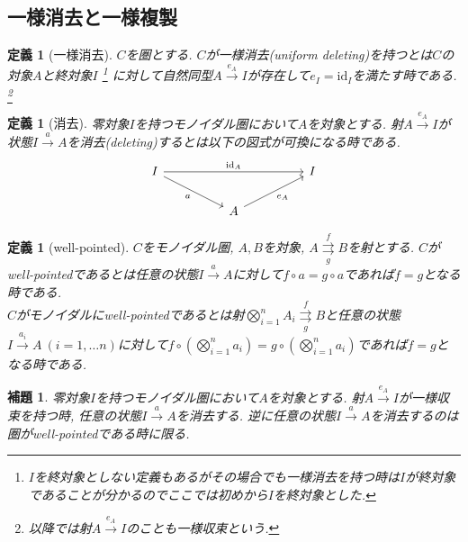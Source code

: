 \documentclass[a4paper,12pt]{ltjsarticle}
\theoremstyle{break}
\newtheorem{defn}[thm]{定義}
\newtheorem{lem}[thm]{補題}
\newtheorem{thrm}[thm]{定理}
\newcommand{\xr}[1]{\xrightarrow{#1}}
\newcommand{\id}{\mathrm{id}}
\newcommand{\ci}{\circ}
\newcommand{\bigot}{\bigotimes}
\numberwithin{equation}{section}
\begin{document}
\subsection{一様消去と一様複製}

\begin{defn}[一様消去]
  $C$を圏とする.
  $C$が一様消去(uniform deleting)を持つとは$C$の対象$A$と終対象$I$
  \footnote{
    $I$を終対象としない定義もあるがその場合でも一様消去を持つ時は$I$が終対象であることが分かるのでここでは初めから$I$を終対象とした. 
  }
  に対して自然同型$A \xr{e_A} I$が存在して$e_I=\id_I$を満たす時である.
  \footnote{
    以降では射$A \xr{e_A} I$のことも一様収束という.
  }
\end{defn}


\begin{defn}[消去]
  零対象$I$を持つモノイダル圏において$A$を対象とする. 
  射$A \xr{e_A} I$が状態$I \xr{a} A$を消去(deleting)するとは以下の図式が可換になる時である. 
  \[\begin{tikzcd}
    I &&&& I \\
    && A
    \arrow["{\id_A}", from=1-1, to=1-5]
    \arrow["a"', from=1-1, to=2-3]
    \arrow["{e_A}"', from=2-3, to=1-5]
  \end{tikzcd}\]
\end{defn}

\begin{defn}[well-pointed]
  $C$をモノイダル圏, $A,B$を対象, $A \overset{f}{\underset{g}{\rightrightarrows}} B$を射とする. 
  $C$がwell-pointedであるとは任意の状態$I \xr{a} A$に対して$f \ci a=g \ci a$であれば$f=g$となる時である. \\
  $C$がモノイダルにwell-pointedであるとは射$\bigot_{i=1}^{n} A_i \overset{f}{\underset{g}{\rightrightarrows}} B$と任意の状態$I \xr{a_i} A ~(i=1,\dots n)$に対して$f \ci \left( \bigot_{i=1}^{n} a_i \right)=g \ci \left( \bigot_{i=1}^{n} a_i \right)$であれば$f=g$となる時である. 
\end{defn}

\begin{lem}
  零対象$I$を持つモノイダル圏において$A$を対象とする. 
  射$A \xr{e_A} I$が一様収束を持つ時, 任意の状態$I \xr{a} A$を消去する. 
  逆に任意の状態$I \xr{a} A$を消去するのは圏がwell-pointedである時に限る. 
\end{lem}
\end{document}
